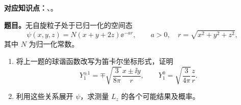 \textbf{对应知识点：}、。

\textbf{题目。}无自旋粒子处于已归一化的空间态
\begin{equation}
  \psi(x,y,z)=N(x+y+2z)\ee^{-ar},
  \qquad a>0,\quad r=\sqrt{x^2+y^2+z^2},
\end{equation}
其中 $N$ 为归一化常数。
\begin{enumerate}
  \item 将上一题的球谐函数改写为笛卡尔坐标形式，证明
    \begin{equation}
      Y_1^{\pm1}=\mp\sqrt{\frac3{8\pi}}\frac{x\pm\ii y}{r},
      \qquad Y_1^0=\sqrt{\frac3{4\pi}}\frac zr.
    \end{equation}
  \item 利用这些关系展开 $\psi$，求测量 $L_z$ 的各个可能结果及概率。
\end{enumerate}

